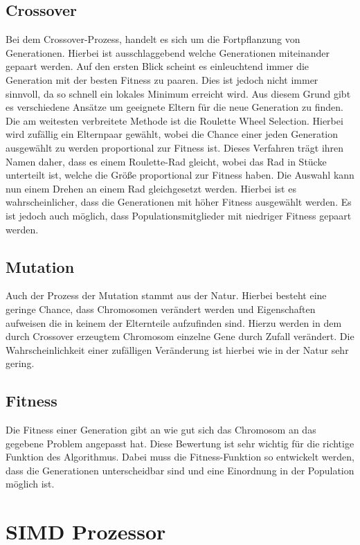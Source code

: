 \subsection{Crossover}
Bei dem Crossover-Prozess, handelt es sich um die Fortpflanzung von Generationen. Hierbei ist ausschlaggebend welche Generationen miteinander gepaart werden. Auf den ersten Blick scheint es einleuchtend immer die Generation mit der besten Fitness zu paaren. Dies ist jedoch nicht immer sinnvoll, da so schnell ein lokales Minimum erreicht wird. Aus diesem Grund gibt es verschiedene Ansätze um geeignete Eltern für die neue Generation zu finden. Die am weitesten verbreitete Methode ist die Roulette Wheel Selection. Hierbei wird zufällig ein Elternpaar gewählt, wobei die Chance einer jeden Generation ausgewählt zu werden proportional zur Fitness ist. Dieses Verfahren trägt ihren Namen daher, dass es einem Roulette-Rad gleicht, wobei das Rad in Stücke unterteilt ist, welche die Größe proportional zur Fitness haben. Die Auswahl kann nun einem Drehen an einem Rad gleichgesetzt werden. Hierbei ist es wahrscheinlicher, dass die Generationen mit höher Fitness ausgewählt werden. Es ist jedoch auch möglich, dass Populationsmitglieder mit niedriger Fitness gepaart werden.
 
\subsection{Mutation}
Auch der Prozess der Mutation stammt aus der Natur. Hierbei besteht eine geringe Chance, dass Chromosomen verändert werden und Eigenschaften aufweisen die in keinem der Elternteile aufzufinden sind. Hierzu werden in dem durch Crossover erzeugtem Chromosom einzelne Gene durch Zufall verändert. Die Wahrscheinlichkeit einer zufälligen Veränderung ist hierbei wie in der Natur sehr gering.
\subsection{Fitness}
Die Fitness einer Generation gibt an wie gut sich das Chromosom an das gegebene Problem angepasst hat. Diese Bewertung ist sehr wichtig für die richtige Funktion des Algorithmus. Dabei muss die Fitness-Funktion so entwickelt werden, dass die Generationen unterscheidbar sind und eine Einordnung in der Population möglich ist.  
\section{SIMD Prozessor}
\label{sec:VLIW}

